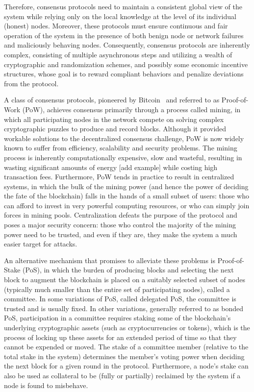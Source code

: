 Therefore, consensus protocols need to maintain a consistent global view of the system while relying only on the local knowledge at the level of its individual (honest) nodes. Moreover, these protocols must ensure continuous and fair operation of the system in the presence of both benign node or network failures and maliciously behaving nodes. Consequently, consensus protocols are inherently complex, consisting of multiple asynchronous steps and utilizing a wealth of cryptographic and randomization schemes, and possibly some economic incentive structures, whose goal is to reward compliant behaviors and penalize deviations from the protocol.

A class of consensus protocols, pioneered by Bitcoin~\cite{Nakamoto2008} and referred to as Proof-of-Work (PoW), achieves consensus primarily through a process called mining, in which all participating nodes in the network compete on solving complex cryptographic puzzles to produce and record blocks. Although it provided workable solutions to the decentralized consensus challenge, PoW is now widely known to suffer from efficiency, scalability and security problems. The mining process is inherently computationally expensive, slow and wasteful, resulting in wasting significant amounts of energy [add example] while costing high transaction fees. Furthermore, PoW tends in practice to result in centralized systems, in which the bulk of the mining power (and hence the power of deciding the fate of the blockchain) falls in the hands of a small subset of users: those who can afford to invest in very powerful computing resources, or who can simply join forces in mining pools. Centralization defeats the purpose of the protocol and poses a major security concern: those who control the majority of the mining power need to be trusted, and even if they are, they make the system a much easier target for attacks. 

An alternative mechanism that promises to alleviate these problems is Proof-of-Stake (PoS), in which the burden of producing blocks and selecting the next block to augment the blockchain is placed on a suitably selected subset of nodes (typically much smaller than the entire set of participating nodes), called a committee. In some variations of PoS, called delegated PoS, the committee is trusted and is usually fixed. In other variations, generally referred to as bonded PoS, participation in a committee requires staking some of the blockchain's underlying cryptographic assets (such as cryptocurrencies or tokens), which is the process of locking up these assets for an extended period of time so that they cannot be expended or moved. The stake of a committee member (relative to the total stake in the system) determines the member's voting power when deciding the next block for a given round in the protocol. Furthermore, a node's stake can also be used as collateral to be (fully or partially) reclaimed by the system if a node is found to misbehave.

